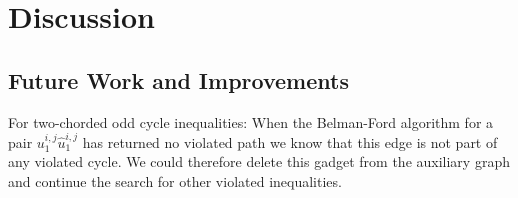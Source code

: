 \section{Discussion}\label{sec:discussion}

\subsection{Future Work and Improvements}\label{subsec:future_work}
For two-chorded odd cycle inequalities:
When the Belman-Ford algorithm for a pair $u_{1}^{i,j}\hat{u}_{1}^{i,j}$ has returned no violated path we know that this edge is not part of any violated cycle.
We could therefore delete this gadget from the auxiliary graph and continue the search for other violated inequalities.

